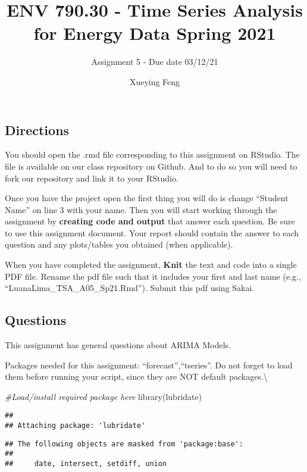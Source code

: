 \documentclass[
]{article}
\title{ENV 790.30 - Time Series Analysis for Energy Data \textbar{}
Spring 2021}
\subtitle{Assignment 5 - Due date 03/12/21}
\author{Xueying Feng}
\date{}
\newenvironment{Shaded}{\begin{snugshade}}{\end{snugshade}}
\newcommand{\CommentTok}[1]{\textcolor[rgb]{0.56,0.35,0.01}{\textit{#1}}}
\newcommand{\FunctionTok}[1]{\textcolor[rgb]{0.00,0.00,0.00}{#1}}
\newcommand{\NormalTok}[1]{#1}
\begin{document}
\maketitle

\hypertarget{directions}{%
\subsection{Directions}\label{directions}}

You should open the .rmd file corresponding to this assignment on
RStudio. The file is available on our class repository on Github. And to
do so you will need to fork our repository and link it to your RStudio.

Once you have the project open the first thing you will do is change
``Student Name'' on line 3 with your name. Then you will start working
through the assignment by \textbf{creating code and output} that answer
each question. Be sure to use this assignment document. Your report
should contain the answer to each question and any plots/tables you
obtained (when applicable).

When you have completed the assignment, \textbf{Knit} the text and code
into a single PDF file. Rename the pdf file such that it includes your
first and last name (e.g., ``LuanaLima\_TSA\_A05\_Sp21.Rmd''). Submit
this pdf using Sakai.

\hypertarget{questions}{%
\subsection{Questions}\label{questions}}

This assignment has general questions about ARIMA Models.

Packages needed for this assignment: ``forecast'',``tseries''. Do not
forget to load them before running your script, since they are NOT
default packages.\textbackslash{}

\begin{Shaded}
\begin{Highlighting}[]
\CommentTok{\#Load/install required package here}
\FunctionTok{library}\NormalTok{(lubridate)}
\end{Highlighting}
\end{Shaded}

\begin{verbatim}
## 
## Attaching package: 'lubridate'
\end{verbatim}

\begin{verbatim}
## The following objects are masked from 'package:base':
## 
##     date, intersect, setdiff, union
\end{verbatim}
\end{document}
